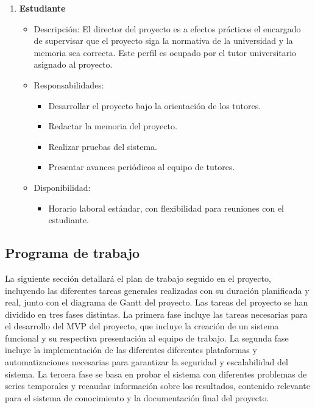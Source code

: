 \begin{enumerate}
    \item \textbf{Estudiante}
    \begin{itemize}
        \item Descripción: El director del proyecto es a efectos prácticos el 
        encargado de supervisar que el proyecto siga la normativa de la universidad y la memoria sea correcta.
        Este perfil es ocupado por el tutor universitario asignado al proyecto.
        \item Responsabilidades:
        \begin{itemize}
            \item Desarrollar el proyecto bajo la orientación de los tutores.
            \item Redactar la memoria del proyecto.
            \item Realizar pruebas del sistema.
            \item Presentar avances periódicos al equipo de tutores.
        \end{itemize}
        \item Disponibilidad:
        \begin{itemize}
            \item Horario laboral estándar, con flexibilidad para reuniones con el estudiante.
        \end{itemize}
    \end{itemize}
\end{enumerate}

\subsection{Programa de trabajo}
La siguiente sección detallará el plan de trabajo seguido en el proyecto,
incluyendo las diferentes tareas generales realizadas con su duración planificada y real,
junto con el diagrama de Gantt del proyecto. Las tareas del proyecto se han
dividido en tres fases distintas. La primera fase incluye las tareas necesarias
para el desarrollo del MVP del proyecto, que incluye la creación de un sistema
funcional y su respectiva presentación al equipo de trabajo. La segunda fase 
incluye la implementación de las diferentes diferentes plataformas y automatizaciones
necesarias para garantizar la seguridad y escalabilidad del sistema. La tercera
fase se basa en probar el sistema con diferentes problemas de series temporales y
recaudar información sobre los resultados, contenido relevante para el sistema de
conocimiento y la documentación final del proyecto.

